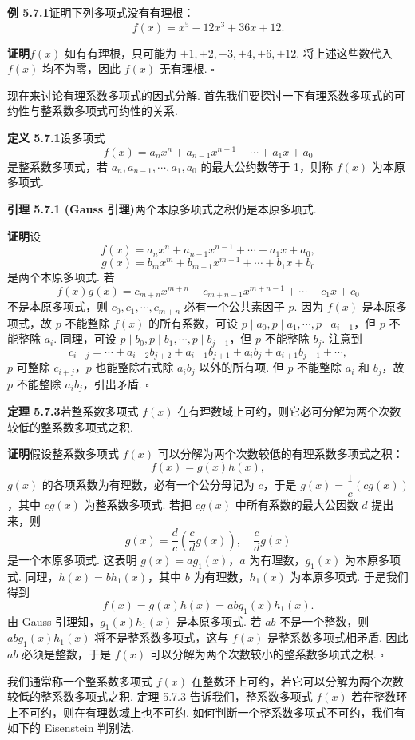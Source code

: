 \documentclass[UTF8,12pt,a4paper,fontset=fandol]{ctexart}
\begin{document}
\noindent\textbf{例 5.7.1}\quad 证明下列多项式没有有理根：
\[
f(x)=x^5-12x^3+36x+12.
\]

\noindent\textbf{证明}\quad $f(x)$ 如有有理根，只可能为 $\pm1,\pm2,\pm3,\pm4,\pm6,\pm12$. 将上述这些数代入 $f(x)$ 均不为零，因此 $f(x)$ 无有理根. $\square$

现在来讨论有理系数多项式的因式分解. 首先我们要探讨一下有理系数多项式的可约性与整系数多项式可约性的关系.

\noindent\textbf{定义 5.7.1}\quad 设多项式
\[
f(x)=a_nx^n+a_{n-1}x^{n-1}+\cdots+a_1x+a_0
\]
是整系数多项式，若 $a_n,a_{n-1},\cdots,a_1,a_0$ 的最大公约数等于 1，则称 $f(x)$ 为本原多项式.

\noindent\textbf{引理 5.7.1 (Gauss 引理)}\quad 两个本原多项式之积仍是本原多项式.

\noindent\textbf{证明}\quad 设
\[
f(x)=a_nx^n+a_{n-1}x^{n-1}+\cdots+a_1x+a_0,
\]
\[
g(x)=b_mx^m+b_{m-1}x^{m-1}+\cdots+b_1x+b_0
\]
是两个本原多项式. 若
\[
f(x)g(x)=c_{m+n}x^{m+n}+c_{m+n-1}x^{m+n-1}+\cdots+c_1x+c_0
\]
不是本原多项式，则 $c_0,c_1,\cdots,c_{m+n}$ 必有一个公共素因子 $p$. 因为 $f(x)$ 是本原多项式，故 $p$ 不能整除 $f(x)$ 的所有系数，可设 $p\mid a_0,p\mid a_1,\cdots,p\mid a_{i-1}$，但 $p$ 不能整除 $a_i$. 同理，可设 $p\mid b_0,p\mid b_1,\cdots,p\mid b_{j-1}$，但 $p$ 不能整除 $b_j$. 注意到
\[
c_{i+j}=\cdots+a_{i-2}b_{j+2}+a_{i-1}b_{j+1}+a_ib_j+a_{i+1}b_{j-1}+\cdots,
\]
$p$ 可整除 $c_{i+j}$，$p$ 也能整除右式除 $a_ib_j$ 以外的所有项. 但 $p$ 不能整除 $a_i$ 和 $b_j$，故 $p$ 不能整除 $a_ib_j$，引出矛盾. $\square$

\noindent\textbf{定理 5.7.3}\quad 若整系数多项式 $f(x)$ 在有理数域上可约，则它必可分解为两个次数较低的整系数多项式之积.

\noindent\textbf{证明}\quad 假设整系数多项式 $f(x)$ 可以分解为两个次数较低的有理系数多项式之积：
\[
f(x)=g(x)h(x),
\]
$g(x)$ 的各项系数为有理数，必有一个公分母记为 $c$，于是 $g(x)=\dfrac1c(cg(x))$，其中 $cg(x)$ 为整系数多项式. 若把 $cg(x)$ 中所有系数的最大公因数 $d$ 提出来，则
\[
g(x)=\frac dc\left(\frac cdg(x)\right),\quad \frac cdg(x)
\]
是一个本原多项式. 这表明 $g(x)=ag_1(x)$，$a$ 为有理数，$g_1(x)$ 为本原多项式. 同理，$h(x)=bh_1(x)$，其中 $b$ 为有理数，$h_1(x)$ 为本原多项式. 于是我们得到
\[
f(x)=g(x)h(x)=abg_1(x)h_1(x).
\]
由 Gauss 引理知，$g_1(x)h_1(x)$ 是本原多项式. 若 $ab$ 不是一个整数，则 $abg_1(x)h_1(x)$ 将不是整系数多项式，这与 $f(x)$ 是整系数多项式相矛盾. 因此 $ab$ 必须是整数，于是 $f(x)$ 可以分解为两个次数较小的整系数多项式之积. $\square$

我们通常称一个整系数多项式 $f(x)$ 在整数环上可约，若它可以分解为两个次数较低的整系数多项式之积. 定理 5.7.3 告诉我们，整系数多项式 $f(x)$ 若在整数环上不可约，则在有理数域上也不可约. 如何判断一个整系数多项式不可约，我们有如下的 Eisenstein 判别法.
\end{document}
